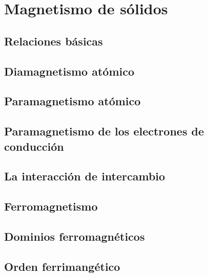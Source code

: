 \chapter{Magnetismo de sólidos} \label{Ch:10}

\section{Relaciones básicas}

\section{Diamagnetismo atómico}

\section{Paramagnetismo atómico}

\section{Paramagnetismo de los electrones de conducción}

\section{La interacción de intercambio}

\section{Ferromagnetismo}

\section{Dominios ferromagnéticos}

\section{Orden ferrimangético}